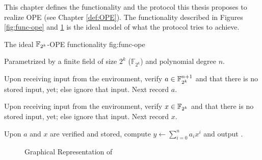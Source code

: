 %
%
\label{sec:protocol}


This chapter defines the functionality \JWfuncSymOPE and the protocol
\JWprotoSymOPE this thesis proposes to realize OPE (see Chapter \ref{def:OPE}).
The functionality described in Figures \ref{fig:func-ope} and
\ref{fig:graph-ope} is the ideal model of what the protocol tries to achieve.

\begin{JWfunc}%
  {\JWfuncSymOPE}%
  {The ideal $\mathbb{F}_{2^k}{}$-OPE functionality \JWfuncSymOPE{}}%
  {fig:func-ope}

  Parametrized by a finite field of size $2^k$ ($\mathbb{F}_{2^k}$)
  and polynomial degree $n$.

  \begin{JWfuncSteps}

  \item Upon receiving input  from the environment, verify
    $a \in \mathbb{F}_{2^k}^{n+1}$ and that there is no stored input, yet; else
    ignore that input. Next record $a$.

  \item Upon receiving input  from the environment,
    verify $x \in \mathbb{F}_{2^k}{}$ and that there is no stored input, yet;
    else ignore that input. Next record $x$.

  \item Upon $a$ and $x$ are verified and stored, compute $y \leftarrow
    \sum_{i=0}^n a_ix^i$ and output .

  \end{JWfuncSteps}
\end{JWfunc}

\begin{figure}[ht]

  \centering


  \caption{Graphical Representation of \JWfuncSymOPE}
  \label{fig:graph-ope}

\end{figure}

